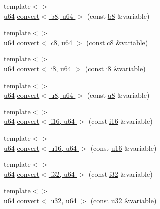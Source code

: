 \begin{DoxyCompactItemize}
\item 
{\footnotesize template$<$$>$ }\\\hyperlink{types_8h_a3f7e2bcbb0b4c338f3c4f6c937cd4234}{u64} \hyperlink{namespacecrap_aadbcb31f1b780a602d0891c816a9283e}{convert$<$ b8, u64 $>$} (const \hyperlink{types_8h_a74eb47b4ab9e428eab7b91b3b877fa6c}{b8} \&variable)
\item 
{\footnotesize template$<$$>$ }\\\hyperlink{types_8h_a3f7e2bcbb0b4c338f3c4f6c937cd4234}{u64} \hyperlink{namespacecrap_ac99256b902559c4b79f1bb58ae4be6dc}{convert$<$ c8, u64 $>$} (const \hyperlink{types_8h_aa1ba8aac9fcd831012308297336ac74b}{c8} \&variable)
\item 
{\footnotesize template$<$$>$ }\\\hyperlink{types_8h_a3f7e2bcbb0b4c338f3c4f6c937cd4234}{u64} \hyperlink{namespacecrap_a1520c233c33e9931ea30de7f9c508a5d}{convert$<$ i8, u64 $>$} (const \hyperlink{types_8h_ae3702327b5f47e83b431e22b33da7b58}{i8} \&variable)
\item 
{\footnotesize template$<$$>$ }\\\hyperlink{types_8h_a3f7e2bcbb0b4c338f3c4f6c937cd4234}{u64} \hyperlink{namespacecrap_a3ff1f95913a7548dc1d48b9750f64eb9}{convert$<$ u8, u64 $>$} (const \hyperlink{types_8h_a92c50087ca0e64fa93fc59402c55f8ca}{u8} \&variable)
\item 
{\footnotesize template$<$$>$ }\\\hyperlink{types_8h_a3f7e2bcbb0b4c338f3c4f6c937cd4234}{u64} \hyperlink{namespacecrap_ada743f5987a79a561adfd4c1a9f920e1}{convert$<$ i16, u64 $>$} (const \hyperlink{types_8h_ad309dbcaeea13aa602d686964156ea0b}{i16} \&variable)
\item 
{\footnotesize template$<$$>$ }\\\hyperlink{types_8h_a3f7e2bcbb0b4c338f3c4f6c937cd4234}{u64} \hyperlink{namespacecrap_a5d1da10fe8e503a939fc066ea3e57c57}{convert$<$ u16, u64 $>$} (const \hyperlink{types_8h_ace9d960e74685e2cd84b36132dbbf8aa}{u16} \&variable)
\item 
{\footnotesize template$<$$>$ }\\\hyperlink{types_8h_a3f7e2bcbb0b4c338f3c4f6c937cd4234}{u64} \hyperlink{namespacecrap_a531430cf40ca7712372c3e01c3a0b960}{convert$<$ i32, u64 $>$} (const \hyperlink{types_8h_a48d6cd8e4135fb2ff7e7f2dac84089ec}{i32} \&variable)
\item 
{\footnotesize template$<$$>$ }\\\hyperlink{types_8h_a3f7e2bcbb0b4c338f3c4f6c937cd4234}{u64} \hyperlink{namespacecrap_a14c6395d3da28290fdc02d7d82f80984}{convert$<$ u32, u64 $>$} (const \hyperlink{types_8h_afaa62991928fb9fb18ff0db62a040aba}{u32} \&variable)

\end{DoxyCompactItemize}
